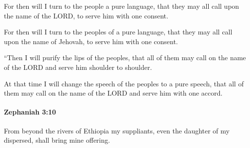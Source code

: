 			For then will I turn to the people a pure language, that they may all call upon the name of the LORD, to serve him with one consent.

			\begin{versebox}
					\item[BHS] 
					\item[LXX] 
					\item[ASV] For then will I turn to the peoples of a pure language, that they may all call upon the name of Jehovah, to serve him with one consent.
					\item[NIV] “Then I will purify the lips of the peoples, that all of them may call on the name of the LORD and serve him shoulder to shoulder.
					\item[NRSV] At that time I will change the speech of the peoples to a pure speech, that all of them may call on the name of the LORD and serve him with one accord.
			\end{versebox}

		\paragraph{Zephaniah 3:10} %
			\label{ZEPHANIAH-3-10}

			From beyond the rivers of Ethiopia my suppliants, even the daughter of my dispersed, shall bring mine offering.

